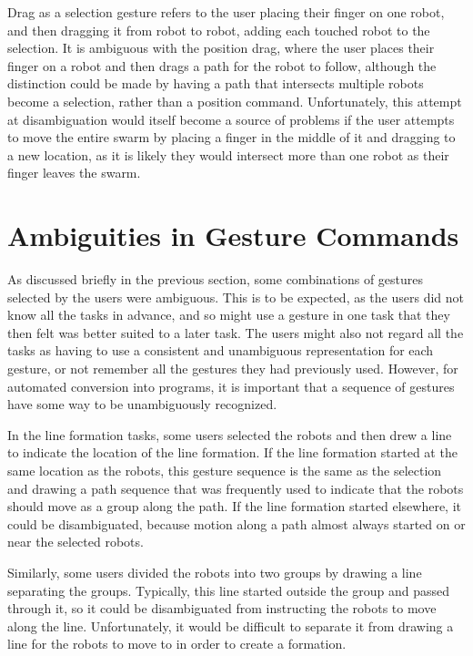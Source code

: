 Drag as a selection gesture refers to the user placing their finger on one robot, and then dragging it from robot to robot, adding each touched robot to the selection. 
It is ambiguous with the position drag, where the user places their finger on a robot and then drags a path for the robot to follow, although the distinction could be made by having a path that intersects multiple robots become a selection, rather than a position command. 
Unfortunately, this attempt at disambiguation would itself become a source of problems if the user attempts to move the entire swarm by placing a finger in the middle of it and dragging to a new location, as it is likely they would intersect more than one robot as their finger leaves the swarm.

\section{Ambiguities in Gesture Commands}

As discussed briefly in the previous section, some combinations of gestures selected by the users were ambiguous. 
This is to be expected, as the users did not know all the tasks in advance, and so might use a gesture in one task that they then felt was better suited to a later task.
The users might also not regard all the tasks as having to use a consistent and unambiguous representation for each gesture, or not remember all the gestures they had previously used. 
However, for automated conversion into programs, it is important that a sequence of gestures have some way to be unambiguously recognized. 

In the line formation tasks, some users selected the robots and then drew a line to indicate the location of the line formation.
If the line formation started at the same location as the robots, this gesture sequence is the same as the selection and drawing a path sequence that was frequently used to indicate that the robots should move as a group along the path. 
If the line formation started elsewhere, it could be disambiguated, because motion along a path almost always started on or near the selected robots.  

Similarly, some users divided the robots into two groups by drawing a line separating the groups.
Typically, this line started outside the group and passed through it, so it could be disambiguated from instructing the robots to move along the line.
Unfortunately, it would be difficult to separate it from drawing a line for the robots to move to in order to create a formation.

